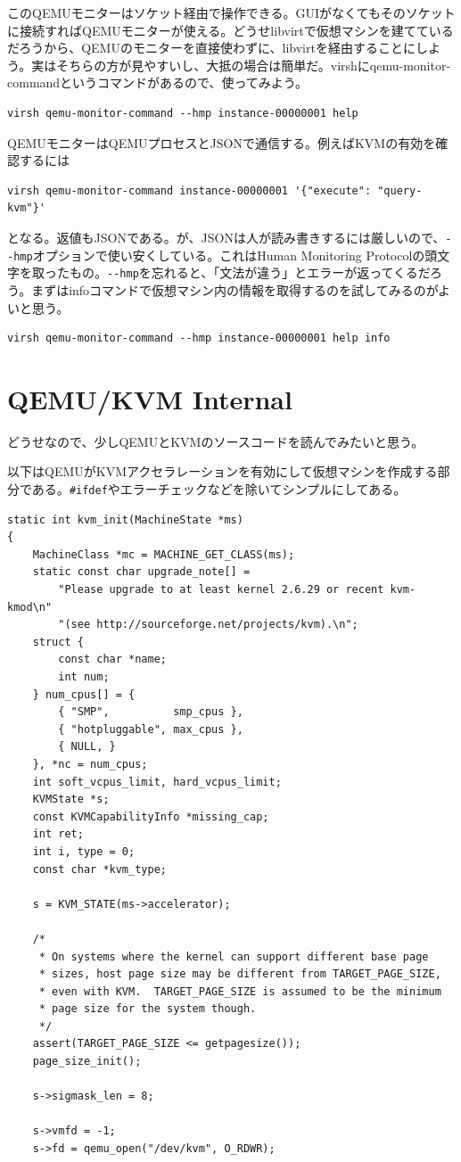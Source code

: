 ﻿\documentclass[9pt,b5paper,tombo,openany]{jsbook}
\begin{document}
このQEMUモニターはソケット経由で操作できる。GUIがなくてもそのソケットに接続すればQEMUモニターが使える。どうせlibvirtで仮想マシンを建てているだろうから、QEMUのモニターを直接使わずに、libvirtを経由することにしよう。実はそちらの方が見やすいし、大抵の場合は簡単だ。virshにqemu-monitor-commandというコマンドがあるので、使ってみよう。

\begin{lstlisting}
virsh qemu-monitor-command --hmp instance-00000001 help
\end{lstlisting}

QEMUモニターはQEMUプロセスとJSONで通信する。例えばKVMの有効を確認するには

\begin{lstlisting}
virsh qemu-monitor-command instance-00000001 '{"execute": "query-kvm"}'
\end{lstlisting}

となる。返値もJSONである。が、JSONは人が読み書きするには厳しいので、\verb|--hmp|オプションで使い安くしている。これはHuman Monitoring Protocolの頭文字を取ったもの。\verb|--hmp|を忘れると、「文法が違う」とエラーが返ってくるだろう。まずはinfoコマンドで仮想マシン内の情報を取得するのを試してみるのがよいと思う。

\begin{lstlisting}
virsh qemu-monitor-command --hmp instance-00000001 help info
\end{lstlisting}

\section{QEMU/KVM Internal}

どうせなので、少しQEMUとKVMのソースコードを読んでみたいと思う。

以下はQEMUがKVMアクセラレーションを有効にして仮想マシンを作成する部分である。\verb|#ifdef|やエラーチェックなどを除いてシンプルにしてある。

\begin{lstlisting}
static int kvm_init(MachineState *ms)
{
    MachineClass *mc = MACHINE_GET_CLASS(ms);
    static const char upgrade_note[] =
        "Please upgrade to at least kernel 2.6.29 or recent kvm-kmod\n"
        "(see http://sourceforge.net/projects/kvm).\n";
    struct {
        const char *name;
        int num;
    } num_cpus[] = {
        { "SMP",          smp_cpus },
        { "hotpluggable", max_cpus },
        { NULL, }
    }, *nc = num_cpus;
    int soft_vcpus_limit, hard_vcpus_limit;
    KVMState *s;
    const KVMCapabilityInfo *missing_cap;
    int ret;
    int i, type = 0;
    const char *kvm_type;

    s = KVM_STATE(ms->accelerator);

    /*
     * On systems where the kernel can support different base page
     * sizes, host page size may be different from TARGET_PAGE_SIZE,
     * even with KVM.  TARGET_PAGE_SIZE is assumed to be the minimum
     * page size for the system though.
     */
    assert(TARGET_PAGE_SIZE <= getpagesize());
    page_size_init();

    s->sigmask_len = 8;

    s->vmfd = -1;
    s->fd = qemu_open("/dev/kvm", O_RDWR);
\end{lstlisting}
\end{document}
